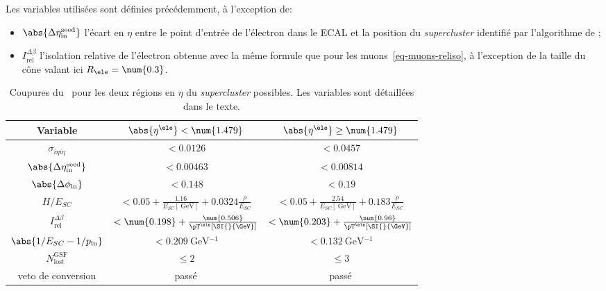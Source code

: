 Les variables utilisées sont définies précédemment, à l'exception de:
\begin{itemize}
\item $\abs{\Delta\eta_\text{in}^\text{seed}}$ l'écart en $\eta$ entre le point d'entrée de l'électron dans le ECAL et la position du \emph{supercluster} identifié par l'algorithme de \PF;
\item $I_\text{rel}^{\Delta\beta}$ l'isolation relative de l'électron obtenue avec la même formule que pour les muons~\eqref{eq-muons-reliso}, à l'exception de la taille du cône valant ici $R_{\ele}=\num{0.3}$.
\end{itemize}
\begin{table}[h]
\centering
\begin{tabular}{ccc}
\toprule
Variable & $\abs{\eta^{\ele}} < \num{1.479}$ & $\abs{\eta^{\ele}} \geq \num{1.479}$ \\
\midrule
$\sigma_{i\eta i\eta}$ & $<\num{0.0126}$ & $<\num{0.0457}$ \\
$\abs{\Delta\eta_\text{in}^\text{seed}}$ & $<\num{0.00463}$ & $<\num{0.00814}$ \\
$\abs{\Delta\phi_\text{in}}$ & $<\num{0.148}$ & $<\num{0.19}$ \\
$H/E_{SC}$ & $<\num{0.05}+\frac{\num{1.16}}{E_{SC} [\SI{}{\GeV}]} + \num{0.0324}\frac{\rho}{E_{SC}}$ & $<\num{0.05}+\frac{\num{2.54}}{E_{SC} [\SI{}{\GeV}]} + \num{0.183}\frac{\rho}{E_{SC}}$ \\
$I_\text{rel}^{\Delta\beta}$ & $<\num{0.198} + \frac{\num{0.506}}{\pT^{\ele} [\SI{}{\GeV}]}$ & $<\num{0.203} + \frac{\num{0.96}}{\pT^{\ele} [\SI{}{\GeV}]}$ \\
$\abs{1/E_{SC}-1/p_\text{in}}$ & $<\SI{0.209}{\GeV^{-1}}$ & $<\SI{0.132}{\GeV^{-1}}$ \\
$N_\text{lost}^\text{GSF}$ & $\leq\num{2}$ & $\leq\num{3}$ \\
veto de conversion & passé & passé \\
\bottomrule
\end{tabular}
\caption[Coupures du \CutBasedEleIDVeto.]{Coupures du \CutBasedEleIDVeto\ pour les deux régions en $\eta$ du \emph{supercluster} possibles. Les variables sont détaillées dans le texte.}
\label{tab-CutBasedEleIDVeto}
\end{table}
